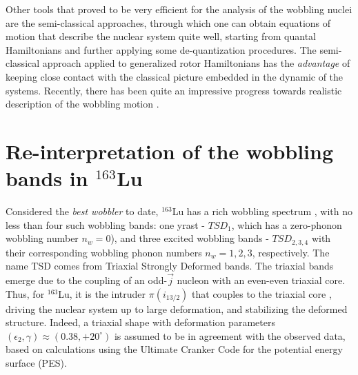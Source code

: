 \documentclass[11pt]{article}
\begin{document}
Other tools that proved to be very efficient for the analysis of the wobbling nuclei are the semi-classical approaches, through which one can obtain equations of motion that describe the nuclear system quite well, starting from quantal Hamiltonians and further applying some de-quantization procedures. The semi-classical approach applied to generalized rotor Hamiltonians has the \emph{advantage} of keeping close contact with the classical picture embedded in the dynamic of the systems. Recently, there has been quite an impressive progress towards realistic description of the wobbling motion \cite{raduta2007semiclassical,frauendorf2014transverse,raduta2017semiclassical,raduta2018wobbling,budaca2018tilted,raduta2020approach,raduta2020towards}.

\section{\texorpdfstring{Re-interpretation of the wobbling bands in $^{163}$Lu}%
                               {Re-interpretation of the wobbling bands structure for 163Lu}}
\label{section-reinterpretation}

Considered the \emph{best wobbler} to date, $^{163}$Lu has a rich wobbling spectrum \cite{odegaard2001evidence,jensen2002evidence}, with no less than four such wobbling bands: one yrast - $TSD_1$, which has a zero-phonon wobbling number $n_w=0$), and three excited wobbling bands - $TSD_{2,3,4}$ with their corresponding wobbling phonon numbers $n_w=1,2,3$, respectively. The name TSD comes from Triaxial Strongly Deformed bands. The triaxial bands emerge due to the coupling of an odd-$\vec{j}$ nucleon with an even-even triaxial core. Thus, for $^{163}$Lu, it is the intruder $\pi(i_{13/2})$ that couples to the triaxial core \cite{odegaard2001evidence,hamamoto2002wobbling,jensen2002wobbling}, driving the nuclear system up to large deformation, and stabilizing the deformed structure. Indeed, a triaxial shape with deformation parameters $(\epsilon_2,\gamma)\approx(0.38,+20^\circ)$ is assumed to be in agreement with the observed data, based on calculations using the Ultimate Cranker Code \cite{bengtsson1990high} for the potential energy surface (PES).
\end{document}
